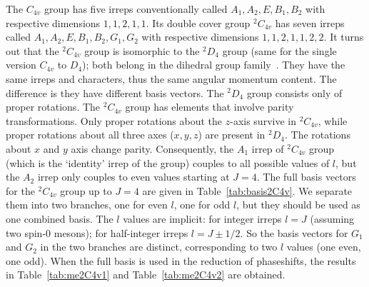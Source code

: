 \documentclass[aps,prd,reprint,showpacs,floatfix,longbibliography,,superscriptaddress]{revtex4-1}
\begin{document}
\begin{widetext}
The $C_{4v}$ group has five irreps conventionally called $A_1, A_2, E, B_1, B_2$ with respective dimensions $1,1,2,1,1$.
Its double cover group $^2C_{4v}$ has seven irreps called $A_1, A_2, E, B_1, B_2, G_1, G_2$ with respective dimensions $1,1,2,1,1,2,2$.
It turns out that the $^2C_{4v}$ group is isomorphic to the $^2D_4$ group (same for the single version $C_{4v}$ to $D_4$); both belong in the dihedral group family~\cite{Chen:2002}.  They have the same irreps and characters, thus the same angular momentum content. 
The difference is they have different basis vectors. 
The $^2D_4$ group consists only of proper rotations. 
The $^2C_{4v}$ group has elements that involve parity transformations. 
Only proper rotations about the $z$-axis survive in $^2C_{4v}$, while proper rotations about 
all three axes ($x,y,z$) are present in $^2D_4$. The rotations about $x$ and $y$ axis change parity. 
Consequently,  the $A_1$ irrep of $^2C_{4v}$ group  (which is the `identity' irrep of the group)
couples to all possible values of $l$, but the $A_2$ irrep only couples to even values starting at $J=4$. 
The full basis vectors for the $^2C_{4v}$ group up to $J=4$ are given in Table~\ref{tab:basis2C4v}. 
We separate them into 
two branches, one for even $l$, one for odd $l$, but they should be used as one combined basis. 
The $l$ values are implicit: for integer irreps $l=J$ (assuming two spin-0 mesons); 
for half-integer irreps $l=J\pm1/2$. So the basis vectors for $G_1$ and $G_2$ in the two branches are distinct, corresponding to two $l$ values (one even, one odd).
When the full basis is used in the reduction of phaseshifts, the results in 
Table~\ref{tab:me2C4v1} and Table~\ref{tab:me2C4v2}  are obtained.


\end{widetext}  


\newpage

%
%
%
%
\end{document}
